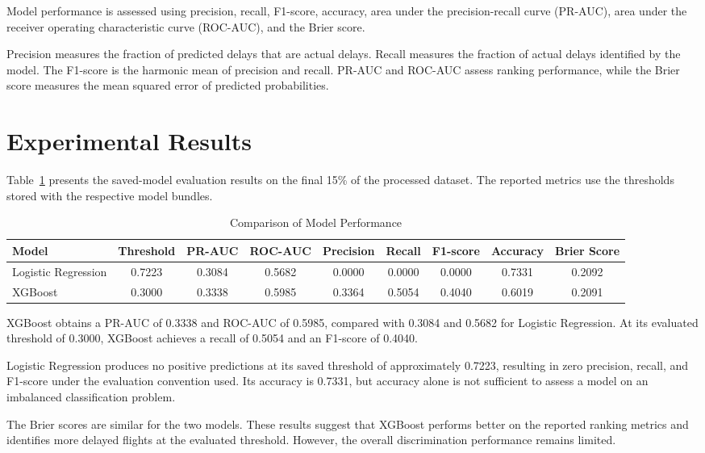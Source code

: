 \documentclass[conference]{IEEEtran}
\begin{document}
Model performance is assessed using precision, recall, F1-score,
accuracy, area under the precision-recall curve (PR-AUC), area under
the receiver operating characteristic curve (ROC-AUC), and the
Brier score.

Precision measures the fraction of predicted delays that are actual
delays. Recall measures the fraction of actual delays identified by
the model. The F1-score is the harmonic mean of precision and recall.
PR-AUC and ROC-AUC assess ranking performance, while the Brier score
measures the mean squared error of predicted probabilities.

\section{Experimental Results}

Table~\ref{tab:results} presents the saved-model evaluation results
on the final 15\% of the processed dataset. The reported metrics use
the thresholds stored with the respective model bundles.

\begin{table}[t]
\centering
\caption{Comparison of Model Performance}
\label{tab:results}
\begin{tabular}{lcccccccc}
\toprule
Model & Threshold & PR-AUC & ROC-AUC & Precision & Recall &
F1-score & Accuracy & Brier Score \\
\midrule
Logistic Regression & 0.7223 & 0.3084 & 0.5682 &
0.0000 & 0.0000 & 0.0000 & 0.7331 & 0.2092 \\
XGBoost & 0.3000 & 0.3338 & 0.5985 &
0.3364 & 0.5054 & 0.4040 & 0.6019 & 0.2091 \\
\bottomrule
\end{tabular}
\end{table}

XGBoost obtains a PR-AUC of 0.3338 and ROC-AUC of 0.5985,
compared with 0.3084 and 0.5682 for Logistic Regression.
At its evaluated threshold of 0.3000, XGBoost achieves a recall
of 0.5054 and an F1-score of 0.4040.

Logistic Regression produces no positive predictions at its saved
threshold of approximately 0.7223, resulting in zero precision,
recall, and F1-score under the evaluation convention used. Its
accuracy is 0.7331, but accuracy alone is not sufficient to assess
a model on an imbalanced classification problem.

The Brier scores are similar for the two models. These results
suggest that XGBoost performs better on the reported ranking metrics
and identifies more delayed flights at the evaluated threshold.
However, the overall discrimination performance remains limited.
\end{document}
